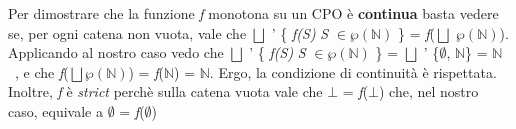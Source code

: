 {	Per dimostrare che la funzione \textit{f} monotona su un CPO è \textbf{continua} basta vedere se, per ogni catena non vuota, vale che $\bigsqcup$ ' \{ \textit{f(S)} \textbar{} \textit{S} $\in\wp(\mathbb{N})$ \} = \textit{f}($\bigsqcup$ $\wp(\mathbb{N})$). \\ 
	Applicando al nostro caso vedo che $\bigsqcup$ ' \{ \textit{f(S)} \textbar{} \textit{S} $\in\wp(\mathbb{N})$ \} = $\bigsqcup$ ' \{$\emptyset$, $\mathbb{N}$\} = $\mathbb{N}$\ , e che \textit{f}($\bigsqcup\wp(\mathbb{N})$) = \textit{f}($\mathbb{N}$) = $\mathbb{N}$. Ergo, la condizione di continuità è rispettata.\\
	
	Inoltre, \textit{f} è \textit{strict} perchè sulla catena vuota vale che $\bot$ = \textit{f}($\bot$) che, nel nostro caso, equivale a $\emptyset$ = \textit{f}($\emptyset$)
	
}